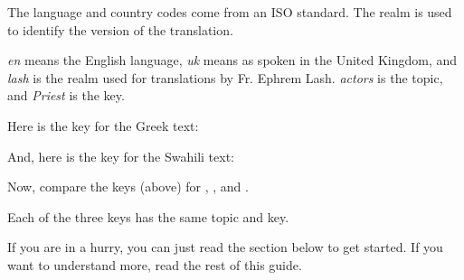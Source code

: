 \documentclass[]{memoir}
\newenvironment{ltDocBlock}{
\color{blue}\verbatim
}
{ 
\endverbatim
\color{black}
}
\begin{document}
The language and country codes come from an ISO standard.  The realm is used to identify the version of the translation.

\emph{en} means the English language, \emph{uk} means as spoken in the United Kingdom, and \emph{lash} is the realm used for translations by Fr. Ephrem Lash.  \emph{actors} is the topic, and \emph{Priest} is the key.

Here is the key for the Greek text:
\begin{ltDocBlock}
%
\end{ltDocBlock}

And, here is the key for the Swahili text:

\begin{ltDocBlock}
%
\end{ltDocBlock}

Now, compare the keys (above) for , , and .

Each of the three keys has the same topic and key.

If you are in a hurry, you can just read the section below to get started.  If you want to understand more, read the rest of this guide.
\end{document}
